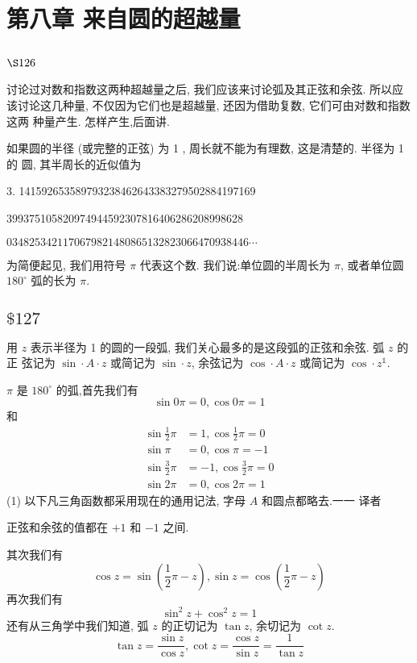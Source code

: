 \chapter{第八章 来自圆的超越量}

\section{$\S 126$}

讨论过对数和指数这两种超越量之后, 我们应该来讨论弧及其正弦和余弦. 所以应 该讨论这几种量, 不仅因为它们也是超越量, 还因为借助复数, 它们可由对数和指数这两 种量产生. 怎样产生,后面讲.

如果圆的半径 (或完整的正弦) 为 1 , 周长就不能为有理数, 这是清楚的. 半径为 1 的 圆, 其半周长的近似值为

3. 141592653589793238462643383279502884197169

399375105820974944592307816406286208998628

$0348253421170679821480865132823066470938446 \cdots$

为简便起见, 我们用符号 $\pi$ 代表这个数. 我们说:单位圆的半周长为 $\pi$, 或者单位圆 $180^{\circ}$ 弧的长为 $\pi$.

\section{$\$ 127$}

用 $z$ 表示半径为 1 的圆的一段弧, 我们关心最多的是这段弧的正弦和余弦. 弧 $z$ 的正 弦记为 $\sin \cdot A \cdot z$ 或简记为 $\sin \cdot z$, 余弦记为 $\cos \cdot A \cdot z$ 或简记为 $\cos \cdot z^{\mathbb{1}}$.

$\pi$ 是 $180^{\circ}$ 的弧,首先我们有
\[
\sin 0 \pi=0, \cos 0 \pi=1
\]
和
\[
\begin{aligned}
\sin \frac{1}{2} \pi & =1, \cos \frac{1}{2} \pi=0 \\
\sin \pi & =0, \cos \pi=-1 \\
\sin \frac{3}{2} \pi & =-1, \cos \frac{3}{2} \pi=0 \\
\sin 2 \pi & =0, \cos 2 \pi=1
\end{aligned}
\]
(1) 以下凡三角函数都采用现在的通用记法, 字母 $A$ 和圆点都略去.一一 译者 

正弦和余弦的值都在 $+1$ 和 $-1$ 之间.

其次我们有
\[
\cos z=\sin \left(\frac{1}{2} \pi-z\right), \sin z=\cos \left(\frac{1}{2} \pi-z\right)
\]
再次我们有
\[
\sin ^{2} z+\cos ^{2} z=1
\]
还有从三角学中我们知道, 弧 $z$ 的正切记为 $\tan z$, 余切记为 $\cot z$.
\[
\tan z=\frac{\sin z}{\cos z}, \cot z=\frac{\cos z}{\sin z}=\frac{1}{\tan z}
\]
